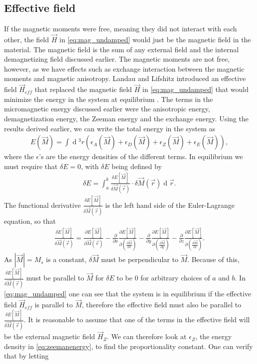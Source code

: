 \documentclass[12pt, a4paper, twoside, openright]{article}		%
\renewcommand{\d}[1]{\ensuremath{\operatorname{d}\!{#1}}}
\numberwithin{equation}{section}
\begin{document}
\subsection{Effective field}
If the magnetic moments were free, meaning they did not interact with each other, the field $\vec{H}$ in \eqref{eq:mag_undamped} would just be the magnetic field in the material. The magnetic field is the sum of any external field and the internal demagnetizing field discussed earlier. The magnetic moments are not free, however, as we have effects such as exchange interaction between the magnetic moments and magnetic anisotropy. Landau and Lifshitz introduced an effective field $\vec{H}_{eff}$ that replaced the magnetic field $\vec{H}$ in \eqref{eq:mag_undamped} that would minimize the energy in the system at equilibrium \cite{LandauLifshitz1935}. The terms in the micromagnetic energy discussed earlier were the anisotropic energy, demagnetization energy, the Zeeman energy and the exchange energy. Using the results derived earlier, we can write the total energy in the system as
\begin{align}
\label{eq:micromagneticenergy}
E(\vec{M}) = \int \d {^3} r \left(\epsilon_A(\vec{M}) + \epsilon_D(\vec{M}) + \epsilon_Z(\vec{M}) + \epsilon_E(\vec{M})\right),
\end{align}
where the $\epsilon$'s are the energy densities of the different terms. In equilibrium we must require that $\delta E=0$, with $\delta E$ being defined by
\begin{align}
\label{eq:deltaE}
\delta E = \int_a^b \frac{\delta E[\vec{M}]}{\delta \vec{M}(\vec{r})}\cdot \delta \vec{M}(\vec{r}) \d {\vec{r}}.
\end{align}
The functional derivative $\frac{\delta E[\vec{M}]}{\delta \vec{M}(\vec{r})}$ is the left hand side of the Euler-Lagrange equation, so that
\begin{align}
\label{eq:functionaldiff}
\frac{\delta E[\vec{M}]}{\delta \vec{M}(\vec{r})} = \frac{\partial E[\vec{M}]}{\partial \vec{M}(\vec{r})} - \frac{\partial}{\partial x} \frac{\partial E[\vec{M}]}{\partial (\frac{\partial \vec{M}}{\partial x})} - \frac{\partial}{\partial y} \frac{\partial E[\vec{M}]}{\partial (\frac{\partial \vec{M}}{\partial y})} - \frac{\partial}{\partial z} \frac{\partial E[\vec{M}]}{\partial (\frac{\partial \vec{M}}{\partial z})}.
\end{align}
As $|\vec{M}| = M_s$ is a constant, $\delta \vec{M}$ must be perpendicular to $\vec{M}$. Because of this, $\frac{\delta E[\vec{M}]}{\delta \vec{M}(\vec{r})}$ must be parallel to $\vec{M}$ for $\delta E$ to be 0 for arbitrary choices of $a$ and $b$. In \eqref{eq:mag_undamped} one can see that the system is in equilibrium if the effective field $\vec{H}_{eff}$ is parallel to $\vec{M}$, therefore the effective field must also be parallel to $\frac{\delta E[\vec{M}]}{\delta \vec{M}(\vec{r})}$. It is reasonable to assume that one of the terms in the effective field will be the external magnetic field $\vec{H}_Z$. We can therefore look at $\epsilon_Z$, the energy density in \eqref{eq:zeemanenergy}, to find the proportionality constant. One can verify that by letting
\end{document}

